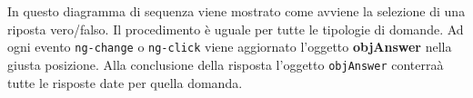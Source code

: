 In questo diagramma di sequenza viene mostrato come avviene la selezione di una riposta vero/falso. Il procedimento è uguale per tutte le tipologie di domande. Ad ogni evento \texttt{ng-change} o \texttt{ng-click} viene aggiornato l'oggetto \textbf{objAnswer} nella giusta posizione. Alla conclusione della risposta l'oggetto \texttt{objAnswer} conterraà tutte le risposte date per quella domanda. 
